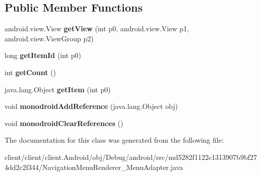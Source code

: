 \subsection*{Public Member Functions}
\begin{DoxyCompactItemize}
\item 
\hypertarget{classmd5282f1122c1313907b9bf274dd2c2f344_1_1NavigationMenuRenderer__MenuAdapter_a4e0a71ad65ebbebe9e233defa6cc764b}{}android.\+view.\+View {\bfseries get\+View} (int p0, android.\+view.\+View p1, android.\+view.\+View\+Group p2)\label{classmd5282f1122c1313907b9bf274dd2c2f344_1_1NavigationMenuRenderer__MenuAdapter_a4e0a71ad65ebbebe9e233defa6cc764b}

\item 
\hypertarget{classmd5282f1122c1313907b9bf274dd2c2f344_1_1NavigationMenuRenderer__MenuAdapter_af117cd2bc0c7ef74a7b9af494848aa27}{}long {\bfseries get\+Item\+Id} (int p0)\label{classmd5282f1122c1313907b9bf274dd2c2f344_1_1NavigationMenuRenderer__MenuAdapter_af117cd2bc0c7ef74a7b9af494848aa27}

\item 
\hypertarget{classmd5282f1122c1313907b9bf274dd2c2f344_1_1NavigationMenuRenderer__MenuAdapter_ad0a1b541e5edf967630044222ecc1a99}{}int {\bfseries get\+Count} ()\label{classmd5282f1122c1313907b9bf274dd2c2f344_1_1NavigationMenuRenderer__MenuAdapter_ad0a1b541e5edf967630044222ecc1a99}

\item 
\hypertarget{classmd5282f1122c1313907b9bf274dd2c2f344_1_1NavigationMenuRenderer__MenuAdapter_a77800f1081741ef0d29cb487d8c30733}{}java.\+lang.\+Object {\bfseries get\+Item} (int p0)\label{classmd5282f1122c1313907b9bf274dd2c2f344_1_1NavigationMenuRenderer__MenuAdapter_a77800f1081741ef0d29cb487d8c30733}

\item 
\hypertarget{classmd5282f1122c1313907b9bf274dd2c2f344_1_1NavigationMenuRenderer__MenuAdapter_a695e64c6c8ef1465f60a52687e490109}{}void {\bfseries monodroid\+Add\+Reference} (java.\+lang.\+Object obj)\label{classmd5282f1122c1313907b9bf274dd2c2f344_1_1NavigationMenuRenderer__MenuAdapter_a695e64c6c8ef1465f60a52687e490109}

\item 
\hypertarget{classmd5282f1122c1313907b9bf274dd2c2f344_1_1NavigationMenuRenderer__MenuAdapter_af09cc24b93a7f3e6a5c1f6a653a0990c}{}void {\bfseries monodroid\+Clear\+References} ()\label{classmd5282f1122c1313907b9bf274dd2c2f344_1_1NavigationMenuRenderer__MenuAdapter_af09cc24b93a7f3e6a5c1f6a653a0990c}

\end{DoxyCompactItemize}


The documentation for this class was generated from the following file\+:\begin{DoxyCompactItemize}
\item 
client/client/client.\+Android/obj/\+Debug/android/src/md5282f1122c1313907b9bf274dd2c2f344/Navigation\+Menu\+Renderer\+\_\+\+Menu\+Adapter.\+java\end{DoxyCompactItemize}
